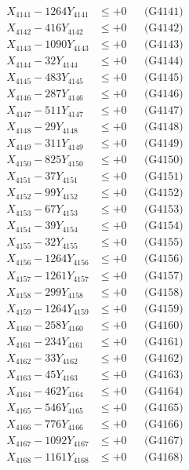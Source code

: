 \documentclass[a4paper,10pt]{article}
\begin{document}
{\begin{align}
\allowbreak
X_{4141} - 1264Y_{4141} &\leq +0 && \text{(G4141)} \\
X_{4142} - 416Y_{4142} &\leq +0 && \text{(G4142)} \\
X_{4143} - 1090Y_{4143} &\leq +0 && \text{(G4143)} \\
X_{4144} - 32Y_{4144} &\leq +0 && \text{(G4144)} \\
X_{4145} - 483Y_{4145} &\leq +0 && \text{(G4145)} \\
X_{4146} - 287Y_{4146} &\leq +0 && \text{(G4146)} \\
X_{4147} - 511Y_{4147} &\leq +0 && \text{(G4147)} \\
X_{4148} - 29Y_{4148} &\leq +0 && \text{(G4148)} \\
X_{4149} - 311Y_{4149} &\leq +0 && \text{(G4149)} \\
X_{4150} - 825Y_{4150} &\leq +0 && \text{(G4150)} \\
\allowbreak
X_{4151} - 37Y_{4151} &\leq +0 && \text{(G4151)} \\
X_{4152} - 99Y_{4152} &\leq +0 && \text{(G4152)} \\
X_{4153} - 67Y_{4153} &\leq +0 && \text{(G4153)} \\
X_{4154} - 39Y_{4154} &\leq +0 && \text{(G4154)} \\
X_{4155} - 32Y_{4155} &\leq +0 && \text{(G4155)} \\
X_{4156} - 1264Y_{4156} &\leq +0 && \text{(G4156)} \\
X_{4157} - 1261Y_{4157} &\leq +0 && \text{(G4157)} \\
X_{4158} - 299Y_{4158} &\leq +0 && \text{(G4158)} \\
X_{4159} - 1264Y_{4159} &\leq +0 && \text{(G4159)} \\
X_{4160} - 258Y_{4160} &\leq +0 && \text{(G4160)} \\
\allowbreak
X_{4161} - 234Y_{4161} &\leq +0 && \text{(G4161)} \\
X_{4162} - 33Y_{4162} &\leq +0 && \text{(G4162)} \\
X_{4163} - 45Y_{4163} &\leq +0 && \text{(G4163)} \\
X_{4164} - 462Y_{4164} &\leq +0 && \text{(G4164)} \\
X_{4165} - 546Y_{4165} &\leq +0 && \text{(G4165)} \\
X_{4166} - 776Y_{4166} &\leq +0 && \text{(G4166)} \\
X_{4167} - 1092Y_{4167} &\leq +0 && \text{(G4167)} \\
X_{4168} - 1161Y_{4168} &\leq +0 && \text{(G4168)} \\

\end{align}}
\end{document}
